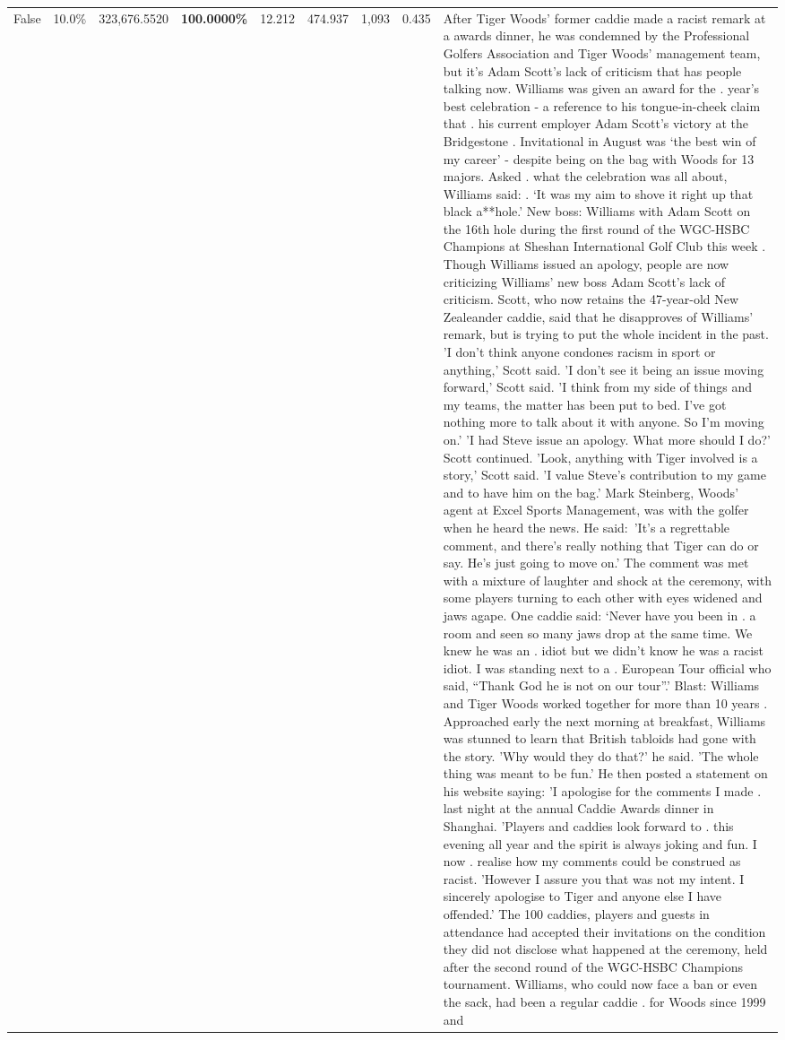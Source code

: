 \begin{table}[H]
\begin{tabular}{lllrlllll}
False & 10.0\% & 323,676.5520 & \bfseries \color{red} 100.0000\% & 12.212 & 474.937 & 1,093 & 0.435 & After Tiger Woods' former caddie made a racist remark at a awards dinner, he was condemned by the Professional Golfers Association and Tiger Woods' management team, but it's Adam Scott's lack of criticism that has people talking now. Williams was given an award for the . year’s best celebration - a reference to his tongue-in-cheek claim that . his current employer Adam Scott’s victory at the Bridgestone . Invitational in August was ‘the best win of my career’ - despite being on the bag with Woods for 13 majors. Asked . what the celebration was all about, Williams said: . ‘It was my aim to shove it right up that black a**hole.’ New boss: Williams with Adam Scott  on the 16th hole during the first round of the WGC-HSBC Champions at Sheshan International Golf Club this week . Though Williams issued an apology, people are now criticizing Williams' new boss Adam Scott's lack of criticism. Scott, who now retains the 47-year-old New Zealeander caddie, said that he disapproves of Williams' remark, but is trying to put the whole incident in the past. 'I don't think anyone condones racism in sport or anything,' Scott said. 'I don't see it being an issue moving forward,' Scott said. 'I think from my side of things and my teams, the matter has been put to bed. I've got nothing more to talk about it with anyone. So I'm moving on.' 'I had Steve issue an apology. What more should I do?' Scott continued. 'Look, anything with Tiger involved is a story,' Scott said. 'I value Steve's contribution to my game and to have him on the bag.' Mark Steinberg, Woods' agent at Excel Sports Management, was with the golfer when he heard the news. He said: 'It's a regrettable comment, and there's really nothing that Tiger can do or say. He's just going to move on.' The comment was met with a mixture of laughter and shock at the ceremony, with some players turning to each other with eyes widened and jaws agape. One caddie said: ‘Never have you been in . a room and seen so many jaws drop at the same time. We knew he was an . idiot but we didn’t know he was a racist idiot. I was standing next to a . European Tour official who said, “Thank God he is not on our tour”.’ Blast: Williams and Tiger Woods worked together for more than 10 years . Approached early the next morning at breakfast, Williams was stunned to learn that British tabloids had gone with the story. 'Why would they do that?' he said. 'The whole thing was meant to be fun.' He then posted a statement on his website saying: 'I apologise for the comments I made . last night at the annual Caddie Awards dinner in Shanghai. 'Players and caddies look forward to . this evening all year and the spirit is always joking and fun. I now . realise how my comments could be construed as racist. 'However I assure you that was not my intent. I sincerely apologise to Tiger and anyone else I have offended.' The 100 caddies, players and guests in attendance had accepted their invitations on the condition they did not disclose what happened at the ceremony, held after the second round of the WGC-HSBC Champions tournament. Williams, who could now face a ban or even the sack, had been a regular caddie . for Woods since 1999 and 
\end{tabular}
\end{table}

